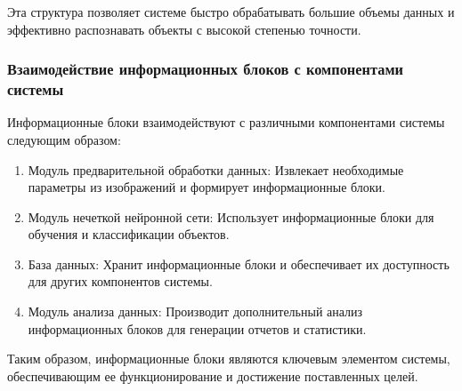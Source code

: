 Эта структура позволяет системе быстро обрабатывать большие объемы данных и эффективно распознавать объекты с высокой степенью точности.

\subsubsection{Взаимодействие информационных блоков с компонентами системы}

Информационные блоки взаимодействуют с различными компонентами системы следующим образом:

\begin{enumerate}
\item Модуль предварительной обработки данных: Извлекает необходимые параметры из изображений и формирует информационные блоки.
\item Модуль нечеткой нейронной сети: Использует информационные блоки для обучения и классификации объектов.
\item База данных: Хранит информационные блоки и обеспечивает их доступность для других компонентов системы.
\item Модуль анализа данных: Производит дополнительный анализ информационных блоков для генерации отчетов и статистики.
\end{enumerate}

Таким образом, информационные блоки являются ключевым элементом системы, обеспечивающим ее функционирование и достижение поставленных целей.



